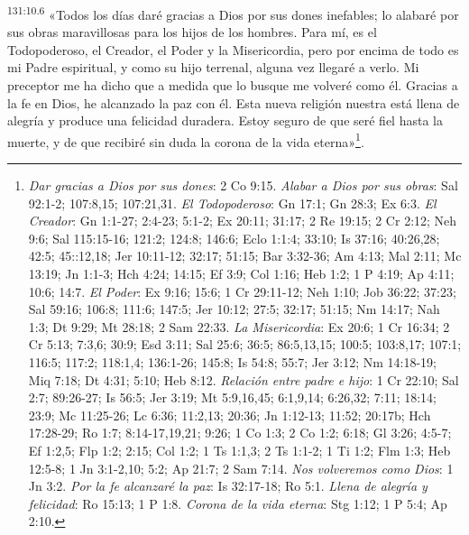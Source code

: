 \par
\textsuperscript{131:10.6} «Todos los días daré gracias a Dios por sus dones inefables; lo alabaré por sus obras maravillosas para los hijos de los hombres. Para mí, es el Todopoderoso, el Creador, el Poder y la Misericordia, pero por encima de todo es mi Padre espiritual, y como su hijo terrenal, alguna vez llegaré a verlo. Mi preceptor me ha dicho que a medida que lo busque me volveré como él. Gracias a la fe en Dios, he alcanzado la paz con él. Esta nueva religión nuestra está llena de alegría y produce una felicidad duradera. Estoy seguro de que seré fiel hasta la muerte, y de que recibiré sin duda la corona de la vida eterna»\footnote{\textit{Dar gracias a Dios por sus dones}: 2 Co 9:15. \textit{Alabar a Dios por sus obras}: Sal 92:1-2; 107:8,15; 107:21,31. \textit{El Todopoderoso}: Gn 17:1; Gn 28:3; Ex 6:3. \textit{El Creador}: Gn 1:1-27; 2:4-23; 5:1-2; Ex 20:11; 31:17; 2 Re 19:15; 2 Cr 2:12; Neh 9:6; Sal 115:15-16; 121:2; 124:8; 146:6; Eclo 1:1:4; 33:10; Is 37:16; 40:26,28; 42:5; 45::12,18; Jer 10:11-12; 32:17; 51:15; Bar 3:32-36; Am 4:13; Mal 2:11; Mc 13:19; Jn 1:1-3; Hch 4:24; 14:15; Ef 3:9; Col 1:16; Heb 1:2; 1 P 4:19; Ap 4:11; 10:6; 14:7. \textit{El Poder}: Ex 9:16; 15:6; 1 Cr 29:11-12; Neh 1:10; Job 36:22; 37:23; Sal 59:16; 106:8; 111:6; 147:5; Jer 10:12; 27:5; 32:17; 51:15; Nm 14:17; Nah 1:3; Dt 9:29; Mt 28:18; 2 Sam 22:33. \textit{La Misericordia}: Ex 20:6; 1 Cr 16:34; 2 Cr 5:13; 7:3,6; 30:9; Esd 3:11; Sal 25:6; 36:5; 86:5,13,15; 100:5; 103:8,17; 107:1; 116:5; 117:2; 118:1,4; 136:1-26; 145:8; Is 54:8; 55:7; Jer 3:12; Nm 14:18-19; Miq 7:18; Dt 4:31; 5:10; Heb 8:12. \textit{Relación entre padre e hijo}: 1 Cr 22:10; Sal 2:7; 89:26-27; Is 56:5; Jer 3:19; Mt 5:9,16,45; 6:1,9,14; 6:26,32; 7:11; 18:14; 23:9; Mc 11:25-26; Lc 6:36; 11:2,13; 20:36; Jn 1:12-13; 11:52; 20:17b; Hch 17:28-29; Ro 1:7; 8:14-17,19,21; 9:26; 1 Co 1:3; 2 Co 1:2; 6:18; Gl 3:26; 4:5-7; Ef 1:2,5; Flp 1:2; 2:15; Col 1:2; 1 Ts 1:1,3; 2 Ts 1:1-2; 1 Ti 1:2; Flm 1:3; Heb 12:5-8; 1 Jn 3:1-2,10; 5:2; Ap 21:7; 2 Sam 7:14. \textit{Nos volveremos como Dios}: 1 Jn 3:2. \textit{Por la fe alcanzaré la paz}: Is 32:17-18; Ro 5:1. \textit{Llena de alegría y felicidad}: Ro 15:13; 1 P 1:8. \textit{Corona de la vida eterna}: Stg 1:12; 1 P 5:4; Ap 2:10.}.

